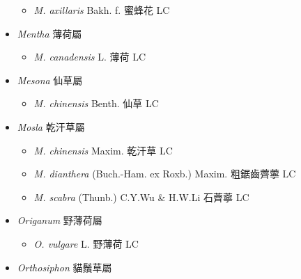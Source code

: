 \begin{itemize}
  \begin{itemize}
        \item[] \textit{M. axillaris} Bakh. f.  蜜蜂花   LC
  \end{itemize}
 \item[] \textit{Mentha} 薄荷屬
                                
  \begin{itemize}
        \item[] \textit{M. canadensis} L.  薄荷   LC
  \end{itemize}
 \item[] \textit{Mesona} 仙草屬
                                
  \begin{itemize}
        \item[] \textit{M. chinensis} Benth.  仙草   LC
  \end{itemize}
 \item[] \textit{Mosla} 乾汗草屬
                                
  \begin{itemize}
        \item[] \textit{M. chinensis} Maxim.  乾汗草   LC
        \item[] \textit{M. dianthera} (Buch.-Ham. ex Roxb.) Maxim.  粗鋸齒薺薴   LC
        \item[] \textit{M. scabra} (Thunb.) C.Y.Wu \& H.W.Li  石薺薴   LC
  \end{itemize}
 \item[] \textit{Origanum} 野薄荷屬
                                
  \begin{itemize}
        \item[] \textit{O. vulgare} L.  野薄荷   LC
  \end{itemize}
 \item[] \textit{Orthosiphon} 貓鬚草屬
                                

\end{itemize}

